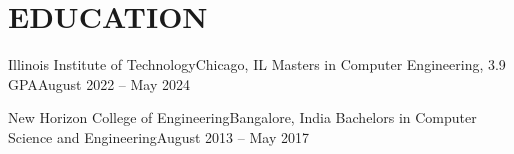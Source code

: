 \section{EDUCATION}\vspace*{-4pt}

    \resumeSubHeadingListStart

        \resumeSubheading
        {Illinois Institute of Technology}{Chicago, IL}
        {Masters in Computer Engineering}{, 3.9 GPA}{August 2022 -- May 2024}
        \resumeItemListStart
        \resumeItemListEnd

        \resumeSubheading
        {New Horizon College of Engineering}{Bangalore, India}
        {Bachelors in Computer Science and Engineering}{}{August 2013 -- May 2017}
        \resumeItemListStart
        \resumeItemListEnd

    \resumeSubHeadingListEnd